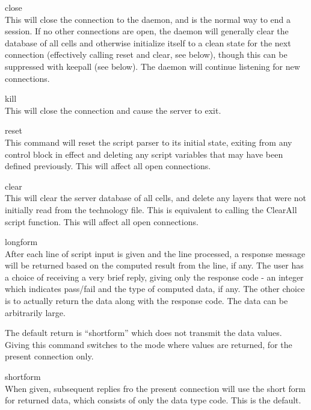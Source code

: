 \begin{description}
\item{\vt close}\\
This will close the connection to the daemon, and is the normal way to
end a session.  If no other connections are open, the daemon will
generally clear the database of all cells and otherwise initialize
itself to a clean state for the next connection (effectively calling
{\vt reset} and {\vt clear}, see below), though this can be suppressed
with {\vt keepall} (see below).  The daemon will continue listening
for new connections.

\item{\vt kill}\\
This will close the connection and cause the server to exit.

\item{\vt reset}\\
This command will reset the script parser to its initial state,
exiting from any control block in effect and deleting any script
variables that may have been defined previously.  This will affect all
open connections.

\item{\vt clear}\\
This will clear the server database of all cells, and delete any
layers that were not initially read from the technology file.  This is
equivalent to calling the {\vt ClearAll} script function.  This will
affect all open connections.

\item{\vt longform}\\
After each line of script input is given and the line processed, a
response message will be returned based on the computed result from
the line, if any.  The user has a choice of receiving a very brief
reply, giving only the response code - an integer which indicates
pass/fail and the type of computed data, if any.  The other choice is
to actually return the data along with the response code.  The data
can be arbitrarily large.

The default return is ``shortform'' which does not transmit the data
values.  Giving this command switches to the mode where values are
returned, for the present connection only.

\item{\vt shortform}\\
When given, subsequent replies fro the present connection will use the
short form for returned data, which consists of only the data type
code.  This is the default.


\end{description}
